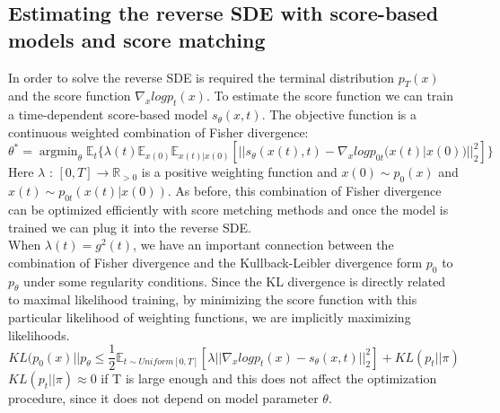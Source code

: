 \documentclass{article}
\begin{document}
     \subsection{Estimating the reverse SDE with score-based models and score matching}
     In order to solve the reverse SDE is required the terminal distribution $p_{T}(x)$ and the score function $\nabla_{x}logp_{t}(x)$. To estimate the score function we can train a time-dependent score-based model $s_{\theta}(x,t)$. The objective function is a continuous weighted combination of Fisher divergence:
     \begin{equation}
	 \theta^*= \mathop{argmin}_{\theta} \mathbb{E}_{t} \{ \lambda(t) \mathbb{E}_{x(0)} \mathbb{E}_{x(t)|x(0)} [||s_{\theta}(x(t),t) - \nabla_{x}logp_{0t}(x(t)|x(0))||_{2}^{2}] \} 
	 \end{equation}      
	 Here $\lambda$ : $[0,T] \rightarrow \mathbb{R}_{>0}$ is a positive weighting function and $x(0) \sim p_{0}(x)$ and $x(t) \sim p_{0t}(x(t)|x(0))$. As before, this combination of Fisher divergence can be optimized efficiently with score metching methods and once the model is trained we can plug it into the reverse SDE.\\
	 When $\lambda(t) = g^2(t)$, we have an important connection between the combination of Fisher divergence and the Kullback-Leibler divergence form $p_{0}$ to $p_{\theta}$ under some regularity conditions. Since the KL divergence is directly related to maximal likelihood training, by minimizing the score function with this particular likelihood of weighting functions, we  are implicitly maximizing likelihoods.
	 \begin{equation}
	 KL(p_{0}(x) || p_{\theta} \leq \frac{1}{2} \mathbb{E}_{t \sim Uniform [0,T]}[\lambda || \nabla_{x}logp_{t}(x)-s_{\theta}(x,t)||_{2}^{2}] + KL(p_{t} || \pi)
	 \end{equation}
	 $KL(p_{t} || \pi) \approx 0$ if T is large enough and this does not affect the optimization procedure, since it does not depend on model parameter $\theta$.
\end{document}
